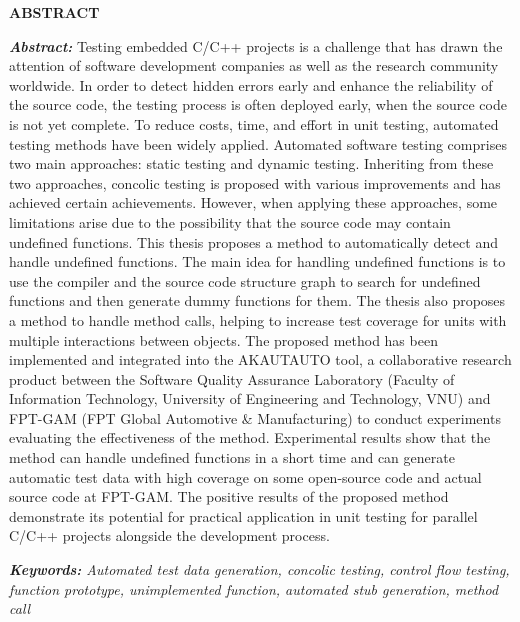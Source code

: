 \newpage
{}
\begin{center}
    \textbf{ABSTRACT}
\end{center}
\changefontsizes[16pt]{12pt}
\textit{\textbf{Abstract: }} 
Testing embedded C/C++ projects is a challenge that has drawn the attention of software development companies as well as the research community worldwide. In order to detect hidden errors early and enhance the reliability of the source code, the testing process is often deployed early, when the source code is not yet complete. To reduce costs, time, and effort in unit testing, automated testing methods have been widely applied. Automated software testing comprises two main approaches: static testing and dynamic testing. Inheriting from these two approaches, concolic testing is proposed with various improvements and has achieved certain achievements. However, when applying these approaches, some limitations arise due to the possibility that the source code may contain undefined functions. This thesis proposes a method to automatically detect and handle undefined functions. The main idea for handling undefined functions is to use the compiler and the source code structure graph to search for undefined functions and then generate dummy functions for them. The thesis also proposes a method to handle method calls, helping to increase test coverage for units with multiple interactions between objects. The proposed method has been implemented and integrated into the AKAUTAUTO tool, a collaborative research product between the Software Quality Assurance Laboratory (Faculty of Information Technology, University of Engineering and Technology, VNU) and FPT-GAM (FPT Global Automotive \& Manufacturing) to conduct experiments evaluating the effectiveness of the method. Experimental results show that the method can handle undefined functions in a short time and can generate automatic test data with high coverage on some open-source code and actual source code at FPT-GAM. The positive results of the proposed method demonstrate its potential for practical application in unit testing for parallel C/C++ projects alongside the development process.

\vspace{-0.5cm}
\begin{flushleft}
  \textit{\textbf{Keywords: } Automated test data generation, concolic testing, control flow testing, function prototype, unimplemented function, automated stub generation, method call}
\end{flushleft}
\changefontsizes[16pt]{13pt}
